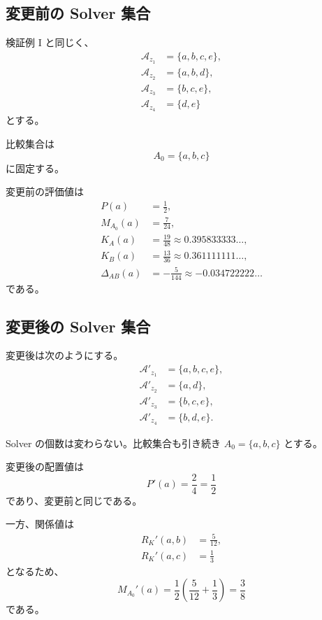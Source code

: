 \documentclass[a4paper,11pt]{ltjsarticle}
\begin{document}
\subsection{変更前の Solver 集合}

検証例 I と同じく、
\begin{align}
  \mathcal{A}_{z_1}&=\{a,b,c,e\},\\
  \mathcal{A}_{z_2}&=\{a,b,d\},\\
  \mathcal{A}_{z_3}&=\{b,c,e\},\\
  \mathcal{A}_{z_4}&=\{d,e\}
\end{align}
とする。

比較集合は
\begin{equation}
  A_0=\{a,b,c\}
\end{equation}
に固定する。

変更前の評価値は
\begin{align}
  P(a)&=\frac12,\\
  M_{A_0}(a)&=\frac7{24},\\
  K_A(a)&=\frac{19}{48}
    \approx0.395833333\ldots,\\
  K_B(a)&=\frac{13}{36}
    \approx0.361111111\ldots,\\
  \Delta_{AB}(a)&=-\frac5{144}
    \approx-0.034722222\ldots
\end{align}
である。

\subsection{変更後の Solver 集合}

変更後は次のようにする。
\begin{align}
  \mathcal{A}'_{z_1}&=\{a,b,c,e\},\\
  \mathcal{A}'_{z_2}&=\{a,d\},\\
  \mathcal{A}'_{z_3}&=\{b,c,e\},\\
  \mathcal{A}'_{z_4}&=\{b,d,e\}.
\end{align}

Solver の個数は変わらない。比較集合も引き続き
$A_0=\{a,b,c\}$ とする。

変更後の配置値は
\begin{equation}
  P'(a)=\frac24=\frac12
\end{equation}
であり、変更前と同じである。

一方、関係値は
\begin{align}
  R_K'(a,b)&=\frac5{12},\\
  R_K'(a,c)&=\frac13
\end{align}
となるため、
\begin{equation}
  M_{A_0}'(a)
  =
  \frac12\left(\frac5{12}+\frac13\right)
  =\frac38
\end{equation}
である。
\end{document}
